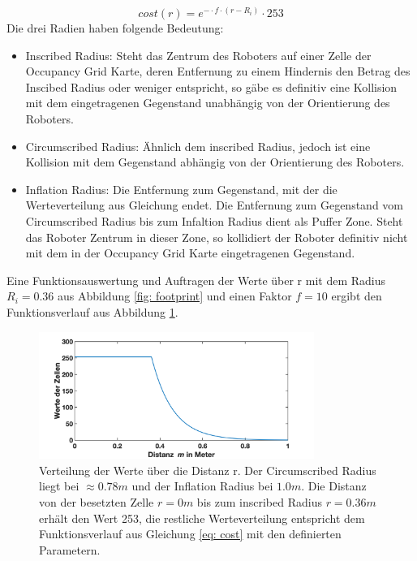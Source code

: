 		  		\begin{equation}
		  		cost(r)=e^{-\cdot f \cdot (r - R_{i})} \cdot 253
		  		\label{eq: cost}
		  		\end{equation}\newline
		  		Die drei Radien haben folgende Bedeutung:
		  		
		  		\begin{itemize}
		  			\item Inscribed Radius: Steht das Zentrum des Roboters auf einer Zelle der Occupancy Grid Karte, deren Entfernung zu einem Hindernis den Betrag des Inscibed Radius oder weniger entspricht, so gäbe es definitiv eine Kollision mit dem eingetragenen Gegenstand unabhängig von der Orientierung des Roboters.\\
		  			
		  			\item Circumscribed Radius: Ähnlich dem inscribed Radius, jedoch ist eine Kollision mit dem Gegenstand abhängig von der Orientierung des Roboters. \\
		  			
		  			\item Inflation Radius: Die Entfernung zum Gegenstand, mit der die Werteverteilung aus Gleichung endet. Die Entfernung zum Gegenstand vom Circumscribed Radius bis zum Infaltion Radius dient als Puffer Zone. Steht das Roboter Zentrum in dieser Zone, so kollidiert der Roboter definitiv nicht mit dem in der Occupancy Grid Karte eingetragenen Gegenstand.
		  		\end{itemize}
		  			    	
		    
		    	Eine Funktionsauswertung und Auftragen der Werte über r mit dem Radius $R_{i}=0.36$ aus Abbildung \ref{fig: footprint} und einen Faktor $f=10$ ergibt den Funktionsverlauf aus Abbildung \ref{fig: costverteilung}.
		    	
		   
		    	 \begin{figure}[H]
		    		\centering
		    		\includegraphics[width=0.8\textwidth]{Bilder/costmap_verteilung.png}
		    		\caption{Verteilung der Werte über die Distanz r. Der Circumscribed Radius liegt bei $\approx0.78\si{m}$ und der Inflation Radius bei $1.0\si{m}$. Die Distanz von der besetzten Zelle $r=0\si{m}$ bis zum inscribed Radius $r=0.36\si{m}$ erhält den Wert 253, die restliche Werteverteilung entspricht dem Funktionsverlauf aus Gleichung \ref{eq: cost} mit den definierten Parametern.} 
		    		\label{fig: costverteilung}
		    	\end{figure}
		    
